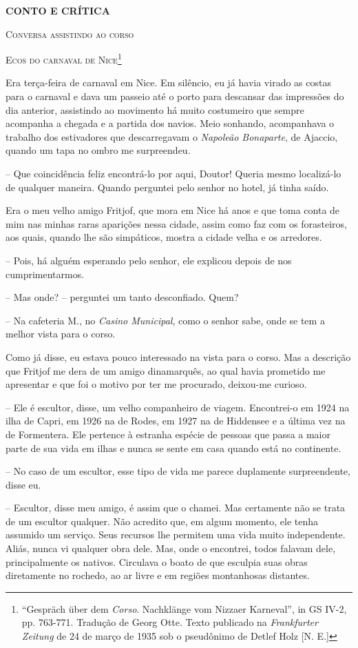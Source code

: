 \textbf{CONTO E CRÍTICA}

\textsc{Conversa assistindo ao corso}

\textsc{Ecos do carnaval de Nice}\footnote{``Gespräch über dem
  \emph{Corso}. Nachklänge vom Nizzaer Karneval'', in GS IV-2, pp.
  763-771. Tradução de Georg Otte. Texto publicado na \emph{Frankfurter
  Zeitung} de 24 de março de 1935 sob o pseudônimo de Detlef Holz {[}N.
  E.{]}}

Era terça-feira de carnaval em Nice. Em silêncio, eu já havia virado as
costas para o carnaval e dava um passeio até o porto para descansar das
impressões do dia anterior, assistindo ao movimento há muito costumeiro
que sempre acompanha a chegada e a partida dos navios. Meio sonhando,
acompanhava o trabalho dos estivadores que descarregavam o
\emph{Napoleão Bonaparte}, de Ajaccio, quando um tapa no ombro me
surpreendeu.

-- Que coincidência feliz encontrá-lo por aqui, Doutor! Queria mesmo
localizá-lo de qualquer maneira. Quando perguntei pelo senhor no hotel,
já tinha saído.

Era o meu velho amigo Fritjof, que mora em Nice há anos e que toma conta
de mim nas minhas raras aparições nessa cidade, assim como faz com os
forasteiros, aos quais, quando lhe são simpáticos, mostra a cidade velha
e os arredores.

-- Pois, há alguém esperando pelo senhor, ele explicou depois de nos
cumprimentarmos.

-- Mas onde? -- perguntei um tanto desconfiado. Quem?

-- Na cafeteria M., no \emph{Casino Municipal}, como o senhor sabe, onde
se tem a melhor vista para o corso.

Como já disse, eu estava pouco interessado na vista para o corso. Mas a
descrição que Fritjof me dera de um amigo dinamarquês, ao qual havia
prometido me apresentar e que foi o motivo por ter me procurado,
deixou-me curioso.

-- Ele é escultor, disse, um velho companheiro de viagem. Encontrei-o em
1924 na ilha de Capri, em 1926 na de Rodes, em 1927 na de Hiddensee e a
última vez na de Formentera. Ele pertence à estranha espécie de pessoas
que passa a maior parte de sua vida em ilhas e nunca se sente em casa
quando está no continente.

-- No caso de um escultor, esse tipo de vida me parece duplamente
surpreendente, disse eu.

-- Escultor, disse meu amigo, é assim que o chamei. Mas certamente não
se trata de um escultor qualquer. Não acredito que, em algum momento,
ele tenha assumido um serviço. Seus recursos lhe permitem uma vida muito
independente. Aliás, nunca vi qualquer obra dele. Mas, onde o encontrei,
todos falavam dele, principalmente os nativos. Circulava o boato de que
esculpia suas obras diretamente no rochedo, ao ar livre e em regiões
montanhosas distantes.

